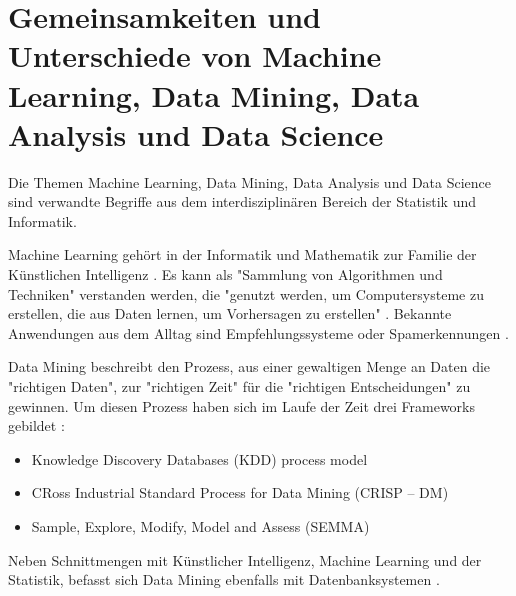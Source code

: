 \section{Gemeinsamkeiten und Unterschiede von Machine Learning, Data Mining, Data Analysis und Data Science}\label{sec:DataMining}
Die Themen Machine Learning, Data Mining, Data Analysis und Data Science sind verwandte Begriffe aus dem interdisziplinären Bereich der Statistik und Informatik.  \par
Machine Learning gehört in der Informatik und Mathematik zur Familie der Künstlichen Intelligenz . Es kann als "Sammlung von Algorithmen und Techniken" verstanden werden, die "genutzt werden, um Computersysteme zu erstellen, die aus Daten lernen, um Vorhersagen zu erstellen" \citep[S.~53; eigene Übersetzung]{swamynathan_mastering_2017}. Bekannte Anwendungen aus dem Alltag sind Empfehlungssysteme oder Spamerkennungen \citep[S.~53]{swamynathan_mastering_2017}.\par
Data Mining beschreibt den Prozess, aus einer gewaltigen Menge an Daten die "richtigen Daten", zur "richtigen Zeit" für die "richtigen Entscheidungen" \citep[S.~61; eigene Übersetzung]{swamynathan_mastering_2017} zu gewinnen. Um diesen Prozess haben sich im Laufe der Zeit drei Frameworks gebildet \citep[S.~69]{swamynathan_mastering_2017}:
\begin{itemize}
\item Knowledge Discovery Databases (KDD) process model
\item CRoss Industrial Standard Process for Data Mining (CRISP – DM)
\item Sample, Explore, Modify, Model and Assess (SEMMA)
\end{itemize}
Neben Schnittmengen mit Künstlicher Intelligenz, Machine Learning und der Statistik, befasst sich Data Mining ebenfalls mit Datenbanksystemen \citep[S.~4]{ramasubramanian_machine_2017}.

